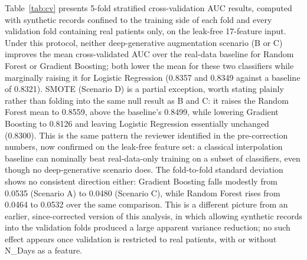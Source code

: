 \documentclass[journal]{IEEEtran}
\begin{document}
Table~\ref{tab:cv} presents 5-fold stratified cross-validation AUC results, computed with synthetic records confined to the training side of each fold and every validation fold containing real patients only, on the leak-free 17-feature input. Under this protocol, neither deep-generative augmentation scenario (B or C) improves the mean cross-validated AUC over the real-data baseline for Random Forest or Gradient Boosting; both lower the mean for these two classifiers while marginally raising it for Logistic Regression (0.8357 and 0.8349 against a baseline of 0.8321). SMOTE (Scenario D) is a partial exception, worth stating plainly rather than folding into the same null result as B and C: it raises the Random Forest mean to 0.8559, above the baseline's 0.8499, while lowering Gradient Boosting to 0.8126 and leaving Logistic Regression essentially unchanged (0.8300). This is the same pattern the reviewer identified in the pre-correction numbers, now confirmed on the leak-free feature set: a classical interpolation baseline can nominally beat real-data-only training on a subset of classifiers, even though no deep-generative scenario does. The fold-to-fold standard deviation shows no consistent direction either: Gradient Boosting falls modestly from 0.0535 (Scenario A) to 0.0480 (Scenario C), while Random Forest rises from 0.0464 to 0.0532 over the same comparison. This is a different picture from an earlier, since-corrected version of this analysis, in which allowing synthetic records into the validation folds produced a large apparent variance reduction; no such effect appears once validation is restricted to real patients, with or without N\_Days as a feature.

\begin{table}[!tb]
  \centering
  \caption{5-Fold Cross-Validation AUC (Mean $\pm$ Std, real-only validation folds, N\_Days excluded)}
  \label{tab:cv}
\end{table}
\end{document}
